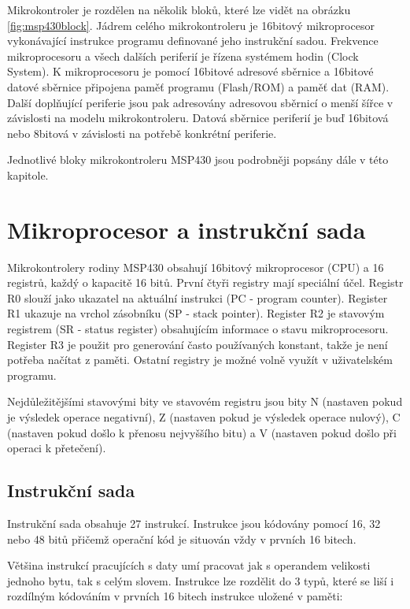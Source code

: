 Mikrokontroler je rozdělen na několik bloků, které lze vidět na obrázku \ref{fig:msp430block}. Jádrem celého mikrokontroleru je 16bitový mikroprocesor
vykonávající instrukce programu definované jeho instrukční sadou. Frekvence mikroprocesoru a všech dalších periferií je řízena systémem hodin (Clock System). K mikroprocesoru je pomocí 16bitové adresové sběrnice a 16bitové datové sběrnice připojena paměť programu (Flash/ROM) a paměť dat (RAM). Další doplňující periferie jsou pak adresovány adresovou sběrnicí o menší šířce v závislosti na modelu mikrokontroleru. Datová sběrnice periferií je buď 16bitová nebo 8bitová v závislosti na potřebě konkrétní periferie.

Jednotlivé bloky mikrokontroleru MSP430 jsou podrobněji popsány dále v této kapitole.

\section{Mikroprocesor a instrukční sada}

Mikrokontrolery rodiny MSP430 obsahují 16bitový mikroprocesor (CPU) a 16 registrů, každý o kapacitě 16 bitů. První čtyři registry mají speciální účel. Registr R0 slouží jako ukazatel na aktuální instrukci (PC - program counter). Register R1 ukazuje na vrchol zásobníku (SP - stack pointer). Register R2 je stavovým registrem (SR - status register) obsahujícím informace o stavu mikroprocesoru. Register R3 je použit pro generování často používaných konstant, takže je není potřeba načítat z paměti. Ostatní registry je možné volně využít v uživatelském programu.

Nejdůležitějšími stavovými bity ve stavovém registru jsou bity N (nastaven pokud je výsledek operace negativní), Z (nastaven pokud je výsledek operace nulový), C (nastaven pokud došlo k přenosu nejvyššího bitu) a V (nastaven pokud došlo při operaci k přetečení).

\subsection{Instrukční sada}

Instrukční sada obsahuje 27 instrukcí. Instrukce jsou kódovány pomocí 16, 32 nebo 48 bitů přičemž operační kód je situován vždy v prvních 16 bitech.

Většina instrukcí pracujících s daty umí pracovat jak s operandem velikosti jednoho bytu, tak s celým slovem. Instrukce lze rozdělit do 3 typů, které se liší i rozdílným kódováním v prvních 16 bitech instrukce uložené v paměti:

